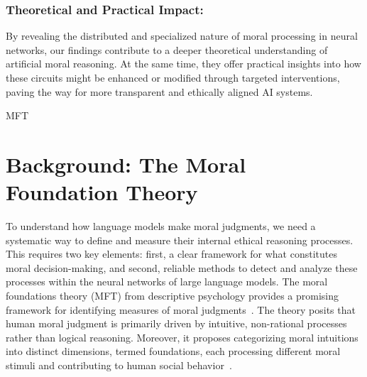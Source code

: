 \subsubsection{Theoretical and Practical Impact:}
By revealing the distributed and specialized nature of moral processing in neural networks, our findings contribute to a deeper theoretical understanding of artificial moral reasoning. At the same time, they offer practical insights into how these circuits might be enhanced or modified through targeted interventions, paving the way for more transparent and ethically aligned AI systems.










MFT



\section{Background: The Moral Foundation Theory}
\label{MFT}
To understand how language models make moral judgments, we need a systematic way to define and measure their internal ethical reasoning processes. This requires two key elements: first, a clear framework for what constitutes moral decision-making, and second, reliable methods to detect and analyze these processes within the neural networks of large language models.
The moral foundations theory (MFT) from descriptive psychology provides a promising framework for identifying measures of moral judgments~\cite{Haidt2004}. The theory posits that human moral judgment is primarily driven by intuitive, non-rational processes rather than logical reasoning. Moreover, it proposes categorizing moral intuitions into distinct dimensions, termed foundations, each processing different moral stimuli and contributing to human social behavior~\cite{Simpson2020}.


